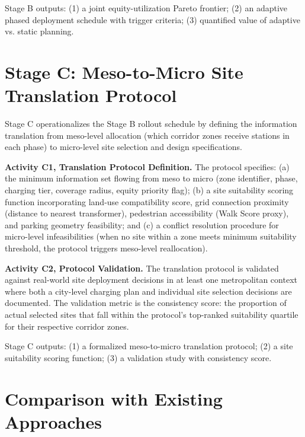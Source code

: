 \documentclass[letterpaper, 12pt, oneside, doublespacing]{Thesis}
\begin{document}
Stage B outputs: (1) a joint equity-utilization Pareto frontier; (2) an adaptive phased deployment schedule with trigger criteria; (3) quantified value of adaptive vs. static planning.

\section{Stage C: Meso-to-Micro Site Translation Protocol}

Stage C operationalizes the Stage B rollout schedule by defining the information translation from meso-level allocation (which corridor zones receive stations in each phase) to micro-level site selection and design specifications.


\noindent \textbf{Activity C1, Translation Protocol Definition.} The protocol specifies: (a) the minimum information set flowing from meso to micro (zone identifier, phase, charging tier, coverage radius, equity priority flag); (b) a site suitability scoring function incorporating land-use compatibility score, grid connection proximity (distance to nearest transformer), pedestrian accessibility (Walk Score proxy), and parking geometry feasibility; and (c) a conflict resolution procedure for micro-level infeasibilities (when no site within a zone meets minimum suitability threshold, the protocol triggers meso-level reallocation).



\noindent \textbf{Activity C2, Protocol Validation.} The translation protocol is validated against real-world site deployment decisions in at least one metropolitan context where both a city-level charging plan and individual site selection decisions are documented. The validation metric is the consistency score: the proportion of actual selected sites that fall within the protocol's top-ranked suitability quartile for their respective corridor zones.


Stage C outputs: (1) a formalized meso-to-micro translation protocol; (2) a site suitability scoring function; (3) a validation study with consistency score.

\section{Comparison with Existing Approaches}
\end{document}
